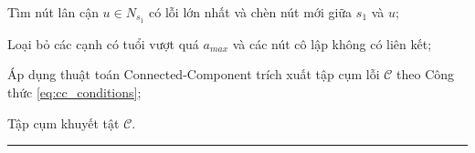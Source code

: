 \begin{algorithmic}[1]
            \State Tìm nút lân cận $u \in N_{s_1}$ có lỗi lớn nhất
            và chèn nút mới giữa $s_1$ và $u$;
        \EndIf

        \State Loại bỏ các cạnh có tuổi vượt quá $a_{max}$
        và các nút cô lập không có liên kết;

    \EndIf

\EndWhile

\State Áp dụng thuật toán Connected-Component trích xuất tập cụm lỗi
$\mathcal{C}$ theo Công thức \ref{eq:cc_conditions};

\Return Tập cụm khuyết tật $\mathcal{C}$.

\end{algorithmic}
\vspace{2pt}
\noindent\hrule
\bigskip